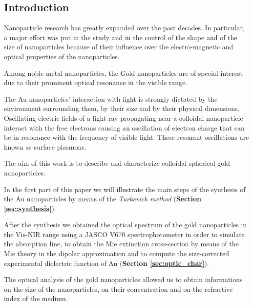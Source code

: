 \documentclass[twocolumn]{article}
\title{}
\author{}
\date{}
\begin{document}
\thispagestyle{fancy}

\thispagestyle{empty}

\tableofcontents

\noindent\makebox[\linewidth]{\color{linescolor} \rule[-0.2cm]{0.85\paperwidth}{1pt}}
\noindent\makebox[\linewidth]{\color{linescolor} \rule[0.3cm]{0.85\paperwidth}{1.2 pt}}


\begin{multicols}{2}
\section{Introduction}
\noindent
Nanoparticle research has greatly expanded over the past decades. 
In particular, a major effort was put in the study and in the control of the shape and of the size of nanoparticles because of their influence over the electro-magnetic and optical properties of the nanoparticles.

Among noble metal nanoparticles, the Gold nanoparticles are of special interest due to their prominent optical resonance in the visible range.

The Au nanoparticles' interaction with light is strongly dictated by the environment surrounding them, by their size and by their physical dimensions. Oscillating electric fields of a light ray propagating near a colloidal nanoparticle interact with the free electrons causing an oscillation of electron charge that can be in resonance with the frequency of visible light. These resonant oscillations are known as surface plasmons. 

The aim of this work is to describe and characterize colloidal spherical gold nanoparticles. 

In the first part of this paper we will illustrate the main steps of the synthesis of the Au nanoparticles by means of the \textit{Turkevich method} (\textbf{Section \ref{sec:synthesis}}). 

After the synthesis we obtained the optical spectrum of the gold nanoparticles in the Vis-NIR range using a JASCO V670 spectrophotometer in order to simulate the absorption line, to obtain the Mie extinction cross-section by means of the Mie theory in the dipolar approximation and to compute the size-corrected experimental dielectric function of Au (\textbf{Section \ref{sec:optic_char}}). 

The optical analysis of the gold nanoparticles allowed us to obtain informations on the size of the nanoparticles, on their concentration and on the refractive index of the medium.


\end{multicols}
\end{document}
